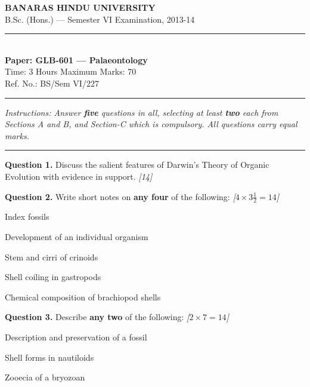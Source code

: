 \documentclass[11pt,a4paper]{article}
\newcommand{\pts}[1]{\hfill   \textit{[#1]}}
\begin{document}
\begin{center}
  {\large\bfseries BANARAS HINDU UNIVERSITY}\\[2pt]
  {\normalsize B.Sc. (Hons.) --- Semester VI Examination, 2013-14}\\[6pt]
  \rule{0.8\linewidth}{0.5pt}\\[6pt]
  {\large\bfseries Paper: GLB-601 --- Palaeontology}\\[4pt]
  {\normalsize Time: 3 Hours \hfill Maximum Marks: 70}\\[2pt]
  {\small Ref. No.: BS/Sem VI/227}
\end{center}
\rule{\linewidth}{0.4pt}
\smallskip



\noindent   \textit{Instructions: Answer   \textbf{five} questions in all, selecting at least   \textbf{two} each from Sections A and B, and Section-C which is compulsory. All questions carry equal marks.}
\bigskip

\bigskip


\rule{\linewidth}{0.4pt}\smallskip




\noindent   \textbf{Question 1.} Discuss the salient features of Darwin's Theory of Organic Evolution with evidence in support. \pts{14}

\medskip


\noindent   \textbf{Question 2.} Write short notes on   \textbf{any four} of the following: \pts{$4  \times 3\frac{1}{2} = 14$}

\begin{parts}
  \item Index fossils
  \item Development of an individual organism
  \item Stem and cirri of crinoids
  \item Shell coiling in gastropods
  \item Chemical composition of brachiopod shells
\end{parts}

\medskip


\noindent   \textbf{Question 3.} Describe   \textbf{any two} of the following: \pts{$2  \times 7 = 14$}

\begin{parts}
  \item Description and preservation of a fossil
  \item Shell forms in nautiloids
  \item Zooecia of a bryozoan
\end{parts}
\end{document}
